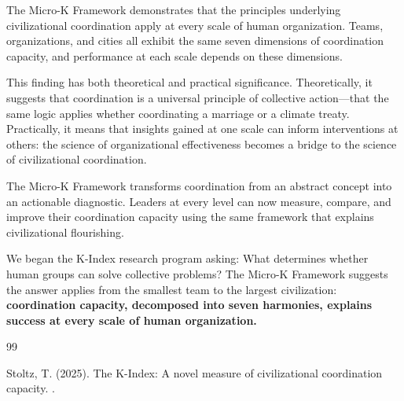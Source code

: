 \documentclass[12pt,a4paper]{article}
\begin{document}
The Micro-K Framework demonstrates that the principles underlying civilizational coordination apply at every scale of human organization. Teams, organizations, and cities all exhibit the same seven dimensions of coordination capacity, and performance at each scale depends on these dimensions.

This finding has both theoretical and practical significance. Theoretically, it suggests that coordination is a universal principle of collective action---that the same logic applies whether coordinating a marriage or a climate treaty. Practically, it means that insights gained at one scale can inform interventions at others: the science of organizational effectiveness becomes a bridge to the science of civilizational coordination.

The Micro-K Framework transforms coordination from an abstract concept into an actionable diagnostic. Leaders at every level can now measure, compare, and improve their coordination capacity using the same framework that explains civilizational flourishing.

We began the K-Index research program asking: What determines whether human groups can solve collective problems? The Micro-K Framework suggests the answer applies from the smallest team to the largest civilization: \textbf{coordination capacity, decomposed into seven harmonies, explains success at every scale of human organization.}



\begin{thebibliography}{99}

Stoltz, T. (2025).
\newblock The K-Index: A novel measure of civilizational coordination capacity.
.

\end{thebibliography}
\end{document}

